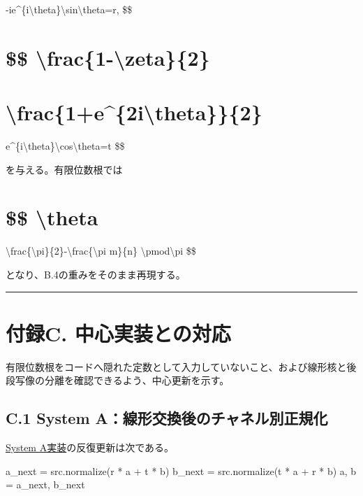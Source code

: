 \documentclass[
  a4paper,
  10pt]{article}
\newenvironment{Shaded}{}{}
\newcommand{\NormalTok}[1]{#1}
\newcommand{\OperatorTok}[1]{\textcolor[rgb]{0.40,0.40,0.40}{#1}}
\begin{document}
-ie\^{}\{i\textbackslash theta\}\textbackslash sin\textbackslash theta=r,
\$\$

\section{\$\$
\textbackslash frac\{1-\textbackslash zeta\}\{2\}}\label{-frac1-zeta2}

\section{\textbackslash frac\{1+e\^{}\{2i\textbackslash theta\}\}\{2\}}\label{frac1e2itheta2}

e\^{}\{i\textbackslash theta\}\textbackslash cos\textbackslash theta=t
\$\$

を与える。有限位数根では

\section{\$\$ \textbackslash theta}\label{-theta-1}

\textbackslash frac\{\textbackslash pi\}\{2\}-\textbackslash frac\{\textbackslash pi
m\}\{n\} \textbackslash pmod\textbackslash pi \$\$

となり、B.4の重みをそのまま再現する。

\begin{center}\rule{0.5\linewidth}{0.5pt}\end{center}

\section{付録C.
中心実装との対応}\label{ux4ed8ux9332c-ux4e2dux5fc3ux5b9fux88c5ux3068ux306eux5bfeux5fdc}

有限位数根をコードへ隠れた定数として入力していないこと、および線形核と後段写像の分離を確認できるよう、中心更新を示す。

\subsection{C.1 System
A：線形交換後のチャネル別正規化}\label{c1-system-aux7ddaux5f62ux4ea4ux63dbux5f8cux306eux30c1ux30e3ux30cdux30ebux5225ux6b63ux898fux5316}

\href{../20260715/run_system_A_localization_exchange_R_sweep_preliminary_v1.py}{System
A実装}の反復更新は次である。

\begin{Shaded}
\begin{Highlighting}[]
\NormalTok{a\_next }\OperatorTok{=}\NormalTok{ src.normalize(r }\OperatorTok{*}\NormalTok{ a }\OperatorTok{+}\NormalTok{ t }\OperatorTok{*}\NormalTok{ b)}
\NormalTok{b\_next }\OperatorTok{=}\NormalTok{ src.normalize(t }\OperatorTok{*}\NormalTok{ a }\OperatorTok{+}\NormalTok{ r }\OperatorTok{*}\NormalTok{ b)}
\NormalTok{a, b }\OperatorTok{=}\NormalTok{ a\_next, b\_next}
\end{Highlighting}
\end{Shaded}
\end{document}
